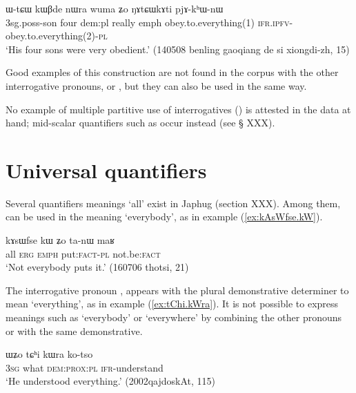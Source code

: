  \begin{exe}
\ex \label{ex:NAtCWkAti}
\gll  ɯ-tɕɯ kɯβde nɯra wuma ʑo ŋɤtɕɯkɤti pjɤ-kʰɯ-nɯ  \\
3sg.poss-son four dem:pl really emph obey.to.everything(1) \textsc{ifr.ipfv}-obey.to.everything(2)-\textsc{pl} \\
\glt `His four sons were very obedient.' (140508 benling gaoqiang de si xiongdi-zh, 15)
\end{exe} 

Good examples of this construction are not found in the corpus with the other interrogative pronouns,  or , but they can also be used in the same way.

No example of multiple partitive use of interrogatives (\citealt[177]{haspelmath97indef}) is attested in the data at hand; mid-scalar quantifiers such as  occur instead (see § XXX). 

\section{Universal quantifiers} \label{sec:quantifiers}
Several quantifiers meanings `all' exist in Japhug (section XXX). Among them,  can be used in the meaning `everybody', as in example (\ref{ex:kAsWfse.kW}).

\begin{exe}
\ex \label{ex:kAsWfse.kW}
\gll kɤsɯfse kɯ ʑo ta-nɯ maʁ \\
all \textsc{erg} \textsc{emph} put:\textsc{fact}-\textsc{pl} not.be:\textsc{fact} \\
\glt `Not everybody puts it.' (160706 thotsi, 21)
\end{exe}

The interrogative pronoun , appears with the plural demonstrative determiner  to mean `everything', as in example (\ref{ex:tChi.kWra}). It is not possible to express meanings such as `everybody' or `everywhere'  by combining the other pronouns  or  with the same demonstrative.

\begin{exe}
\ex \label{ex:tChi.kWra}
\gll ɯʑo tɕʰi kɯra ko-tso \\
\textsc{3sg} what \textsc{dem:prox:pl} \textsc{ifr}-understand \\
\glt `He understood everything.' (2002qajdoskAt, 115)
\end{exe}

